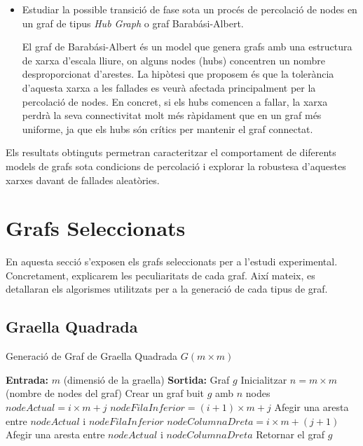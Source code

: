 \documentclass[a4paper]{article}
\begin{document}
\begin{itemize}
		\item Estudiar la possible transició de fase sota un procés de percolació de nodes en un graf de tipus \textit{Hub Graph} o graf Barabási-Albert.
		
		\par El graf de Barabási-Albert és un model que genera grafs amb una estructura de xarxa d'escala lliure, on alguns nodes (hubs) concentren un nombre desproporcionat d'arestes. La hipòtesi que proposem és que la tolerància d'aquesta xarxa a les fallades es veurà afectada principalment per la percolació de nodes. En concret, si els hubs comencen a fallar, la xarxa perdrà la seva connectivitat molt més ràpidament que en un graf més uniforme, ja que els hubs són crítics per mantenir el graf connectat. \\
		
	\end{itemize}
	
	Els resultats obtinguts permetran caracteritzar el comportament de diferents models de grafs sota condicions de percolació i explorar la robustesa d'aquestes xarxes davant de fallades aleatòries.
	
	\newpage
	\section{Grafs Seleccionats}

	En aquesta secció s'exposen els grafs seleccionats per a l'estudi experimental. Concretament, explicarem les peculiaritats de cada graf. Així mateix, es detallaran els algorismes utilitzats per a la generació de cada tipus de graf. 

	\subsection{Graella Quadrada}
	
	\begin{algorithm} [H]
		\caption{Generació de Graf de Graella Quadrada $G(m \times m)$}
		\begin{algorithmic} [1]
			\Statex \textbf{Entrada:} $m$ (dimensió de la graella)
			\Statex \textbf{Sortida:} Graf $g$ 
			\Statex \vspace{-0.25em}
			\State Inicialitzar $n = m \times m$ (nombre de nodes del graf)
			\State Crear un graf buit $g$ amb $n$ nodes
					\State $nodeActual = i \times m + j$
						\State $nodeFilaInferior = (i + 1) \times m + j$
						\State Afegir una aresta entre $nodeActual$ i $nodeFilaInferior$
					\EndIf
						\State $nodeColumnaDreta = i \times m + (j + 1)$
						\State Afegir una aresta entre $nodeActual$ i $nodeColumnaDreta$
					\EndIf
				\EndFor
			\EndFor
			\State Retornar el graf $g$
		\end{algorithmic}
	\end{algorithm}
\end{document}

